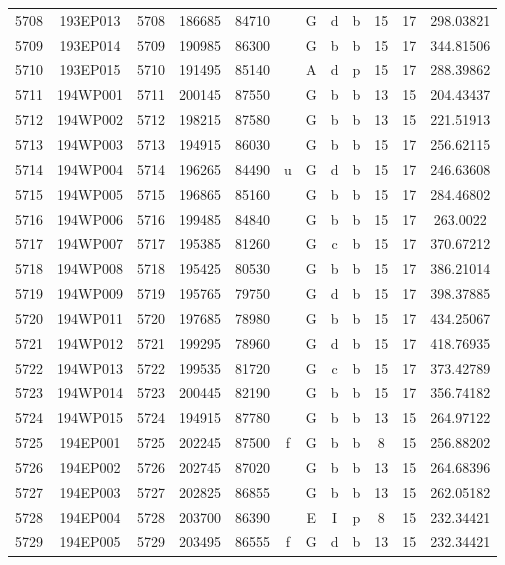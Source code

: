 \begin{tabular}{|*{12}{c|}}
5708 & 193EP013 & 5708 & 186685 & 84710 &  & G & d & b & 15 & 17 & 298.03821 \\ 
5709 & 193EP014 & 5709 & 190985 & 86300 &  & G & b & b & 15 & 17 & 344.81506 \\ 
5710 & 193EP015 & 5710 & 191495 & 85140 &  & A & d & p & 15 & 17 & 288.39862 \\ 
5711 & 194WP001 & 5711 & 200145 & 87550 &  & G & b & b & 13 & 15 & 204.43437 \\ 
5712 & 194WP002 & 5712 & 198215 & 87580 &  & G & b & b & 13 & 15 & 221.51913 \\ 
5713 & 194WP003 & 5713 & 194915 & 86030 &  & G & b & b & 15 & 17 & 256.62115 \\ 
5714 & 194WP004 & 5714 & 196265 & 84490 & u & G & d & b & 15 & 17 & 246.63608 \\ 
5715 & 194WP005 & 5715 & 196865 & 85160 &  & G & b & b & 15 & 17 & 284.46802 \\ 
5716 & 194WP006 & 5716 & 199485 & 84840 &  & G & b & b & 15 & 17 & 263.0022 \\ 
5717 & 194WP007 & 5717 & 195385 & 81260 &  & G & c & b & 15 & 17 & 370.67212 \\ 
5718 & 194WP008 & 5718 & 195425 & 80530 &  & G & b & b & 15 & 17 & 386.21014 \\ 
5719 & 194WP009 & 5719 & 195765 & 79750 &  & G & d & b & 15 & 17 & 398.37885 \\ 
5720 & 194WP011 & 5720 & 197685 & 78980 &  & G & b & b & 15 & 17 & 434.25067 \\ 
5721 & 194WP012 & 5721 & 199295 & 78960 &  & G & d & b & 15 & 17 & 418.76935 \\ 
5722 & 194WP013 & 5722 & 199535 & 81720 &  & G & c & b & 15 & 17 & 373.42789 \\ 
5723 & 194WP014 & 5723 & 200445 & 82190 &  & G & b & b & 15 & 17 & 356.74182 \\ 
5724 & 194WP015 & 5724 & 194915 & 87780 &  & G & b & b & 13 & 15 & 264.97122 \\ 
5725 & 194EP001 & 5725 & 202245 & 87500 & f & G & b & b & 8 & 15 & 256.88202 \\ 
5726 & 194EP002 & 5726 & 202745 & 87020 &  & G & b & b & 13 & 15 & 264.68396 \\ 
5727 & 194EP003 & 5727 & 202825 & 86855 &  & G & b & b & 13 & 15 & 262.05182 \\ 
5728 & 194EP004 & 5728 & 203700 & 86390 &  & E & I & p & 8 & 15 & 232.34421 \\ 
5729 & 194EP005 & 5729 & 203495 & 86555 & f & G & d & b & 13 & 15 & 232.34421 \\ 

\end{tabular}
